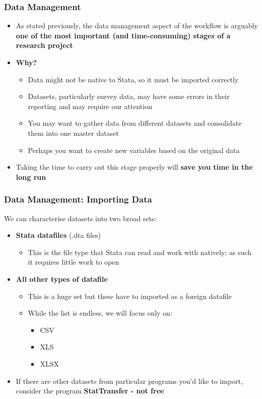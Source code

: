 \documentclass[10pt, compress]{beamer}
\begin{document}
\begin{frame}[fragile]
\frametitle{Data Management}
\begin{itemize}
\item As stated previously, the data management aspect of the workflow is arguably \textbf{one of the most important (and time-consuming) stages of a research project}
\item \textbf{Why?}
\begin{itemize}
\item Data \alert{might not be native to Stata}, so it must be imported correctly
\item Datasets, particularly survey data, may have some \alert{errors in their reporting and may require our attention}
\item You may want to gather data from different datasets and \alert{consolidate them into one master dataset}
\item Perhaps you want to \alert{create new variables} based on the original data
\end{itemize}
\item Taking the time to carry out this stage properly will \textbf{save you time in the long run}
\end{itemize}
\end{frame}

\begin{frame}[fragile]
\frametitle{Data Management: Importing Data}
We can characterise datasets into two broad sets:
\begin{itemize}
\item \textbf{Stata datafiles} (.dta files)
\begin{itemize}
\item This is the file type that Stata can read and work with \alert{natively}; as such it requires little work to open
\end{itemize}
\item \textbf{All other types of datafile}
\begin{itemize}
\item This is a huge set but these have to imported as a \alert{foreign} datafile
\item While the list is endless, we will focus only on:
\begin{itemize}
\item CSV
\item XLS
\item XLSX
\end{itemize}
\end{itemize}
\item If there are other datasets from particular programs you'd like to import, consider the program \textbf{StatTransfer - \alert{not free}}
\end{itemize}
\end{frame}
\end{document}
